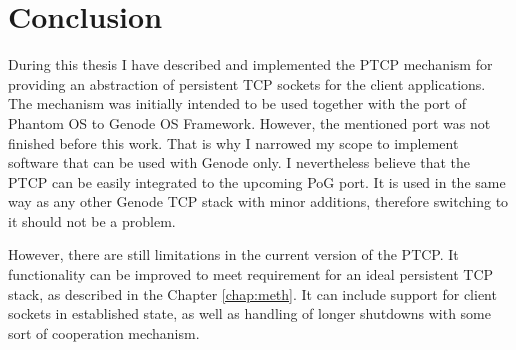 \chapter{Conclusion}
\label{chap:conc}

During this thesis I have described and implemented the PTCP mechanism for
providing an abstraction of persistent TCP sockets for the client applications.
The mechanism was initially intended to be used together with the port of
Phantom OS to Genode OS Framework. However, the mentioned port was not finished
before this work. That is why I narrowed my scope to implement software that
can be used with Genode only. I nevertheless believe that the PTCP can be
easily integrated to the upcoming PoG port. It is used in the same way as any
other Genode TCP stack with minor additions, therefore switching to it should
not be a problem.

However, there are still limitations in the current version of the PTCP. It
functionality can be improved to meet requirement for an ideal persistent TCP
stack, as described in the Chapter \ref{chap:meth}. It can include support for
client sockets in established state, as well as handling of longer shutdowns
with some sort of cooperation mechanism.
